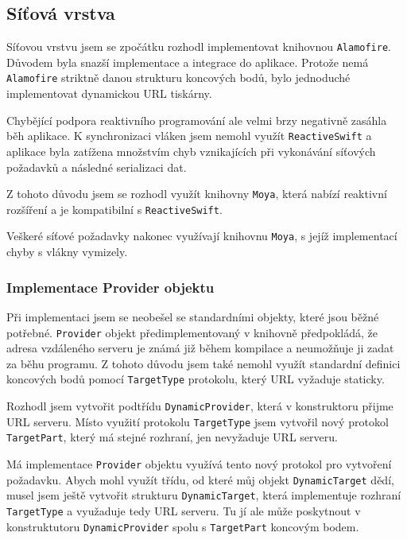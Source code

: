 \subsection{Síťová vrstva}

Síťovou vrstvu jsem se zpočátku rozhodl implementovat knihovnou \texttt{Alamofire}.
Důvodem byla snazší implementace a integrace do aplikace.
Protože nemá \texttt{Alamofire} striktně danou strukturu koncových bodů, bylo jednoduché implementovat dynamickou URL tiskárny.

Chybějící podpora reaktivního programování ale velmi brzy negativně zasáhla běh aplikace.
K synchronizaci vláken jsem nemohl využít \texttt{ReactiveSwift} a aplikace byla zatížena množstvím chyb vznikajících při vykonávání síťových požadavků a následné serializaci dat.

Z tohoto důvodu jsem se rozhodl využít knihovny \texttt{Moya}, která nabízí reaktivní rozšíření a je kompatibilní s \texttt{ReactiveSwift}.

Veškeré síťové požadavky nakonec využívají knihovnu \texttt{Moya}, s jejíž implementací chyby s vlákny vymizely.

\subsubsection*{Implementace Provider objektu}

Při implementaci jsem se neobešel se standardními objekty, které jsou běžné potřebné.
\texttt{Provider} objekt předimplementovaný v knihovně předpokládá, že adresa vzdáleného serveru je známá již během kompilace a neumožňuje ji zadat za běhu programu.
Z tohoto důvodu jsem také nemohl využít standardní definici koncových bodů pomocí \texttt{TargetType} protokolu, který URL vyžaduje staticky.

Rozhodl jsem vytvořit podtřídu \texttt{DynamicProvider}, která v konstruktoru přijme URL serveru.
Místo využití protokolu \texttt{TargetType} jsem vytvořil nový protokol \texttt{TargetPart}, který má stejné rozhraní, jen nevyžaduje URL serveru.

Má implementace \texttt{Provider} objektu využívá tento nový protokol pro vytvoření požadavku.
Abych mohl využít třídu, od které můj objekt \texttt{DynamicTarget} dědí, musel jsem ještě vytvořit strukturu \texttt{DynamicTarget}, která implementuje rozhraní \texttt{TargetType} a využaduje tedy URL serveru.
Tu jí ale může poskytnout v konstruktutoru \texttt{DynamicProvider} spolu s \texttt{TargetPart} koncovým bodem.

